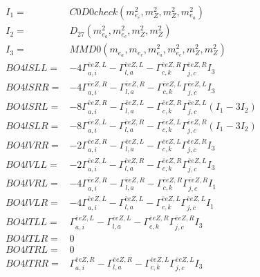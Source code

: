 \documentclass[A4,landscape]{article}
\begin{document}
\begin{align} 
I_1 = & C0D0check(m^2_{e_{{c}}}, m^2_{Z}, m^2_{Z}, m^2_{e_{{a}}}) \\ 
I_2 = & D_{27}(m^2_{e_{{a}}}, m^2_{e_{{c}}}, m^2_{Z}, m^2_{Z}) \\ 
I_3 = & MMD0(m_{e_{{a}}}, m_{e_{{c}}}, m^2_{e_{{a}}}, m^2_{e_{{c}}}, m^2_{Z}, m^2_{Z}) \\ 
  BO4lSLL= & -4  \Gamma^{\bar{e}e Z ,L}_{a, i} - \Gamma^{\bar{e}e Z ,L} _{l, a} - \Gamma^{\bar{e}e Z ,R} _{c, k} \Gamma^{\bar{e}e Z ,R}_{j, c} I_3 \\ 
  BO4lSRR= & -4  \Gamma^{\bar{e}e Z ,R}_{a, i} - \Gamma^{\bar{e}e Z ,R} _{l, a} - \Gamma^{\bar{e}e Z ,L} _{c, k} \Gamma^{\bar{e}e Z ,L}_{j, c} I_3 \\ 
  BO4lSRL= & -8  \Gamma^{\bar{e}e Z ,R}_{a, i} - \Gamma^{\bar{e}e Z ,L} _{l, a} - \Gamma^{\bar{e}e Z ,R} _{c, k} \Gamma^{\bar{e}e Z ,L}_{j, c} (I_1 - 3 I_2) \\ 
  BO4lSLR= & -8  \Gamma^{\bar{e}e Z ,L}_{a, i} - \Gamma^{\bar{e}e Z ,R} _{l, a} - \Gamma^{\bar{e}e Z ,L} _{c, k} \Gamma^{\bar{e}e Z ,R}_{j, c} (I_1 - 3 I_2) \\ 
  BO4lVRR= & -2  \Gamma^{\bar{e}e Z ,R}_{a, i} - \Gamma^{\bar{e}e Z ,L} _{l, a} - \Gamma^{\bar{e}e Z ,L} _{c, k} \Gamma^{\bar{e}e Z ,R}_{j, c} I_3 \\ 
  BO4lVLL= & -2  \Gamma^{\bar{e}e Z ,L}_{a, i} - \Gamma^{\bar{e}e Z ,R} _{l, a} - \Gamma^{\bar{e}e Z ,R} _{c, k} \Gamma^{\bar{e}e Z ,L}_{j, c} I_3 \\ 
  BO4lVRL= & -4  \Gamma^{\bar{e}e Z ,R}_{a, i} - \Gamma^{\bar{e}e Z ,R} _{l, a} - \Gamma^{\bar{e}e Z ,R} _{c, k} \Gamma^{\bar{e}e Z ,R}_{j, c} I_1 \\ 
  BO4lVLR= & -4  \Gamma^{\bar{e}e Z ,L}_{a, i} - \Gamma^{\bar{e}e Z ,L} _{l, a} - \Gamma^{\bar{e}e Z ,L} _{c, k} \Gamma^{\bar{e}e Z ,L}_{j, c} I_1 \\ 
  BO4lTLL= &  \Gamma^{\bar{e}e Z ,L}_{a, i} - \Gamma^{\bar{e}e Z ,L} _{l, a} - \Gamma^{\bar{e}e Z ,R} _{c, k} \Gamma^{\bar{e}e Z ,R}_{j, c} I_3 \\ 
  BO4lTLR= & 0 \\ 
  BO4lTRL= & 0 \\ 
  BO4lTRR= &  \Gamma^{\bar{e}e Z ,R}_{a, i} - \Gamma^{\bar{e}e Z ,R} _{l, a} - \Gamma^{\bar{e}e Z ,L} _{c, k} \Gamma^{\bar{e}e Z ,L}_{j, c} I_3 \\ 
\end{align} 
\end{document}
